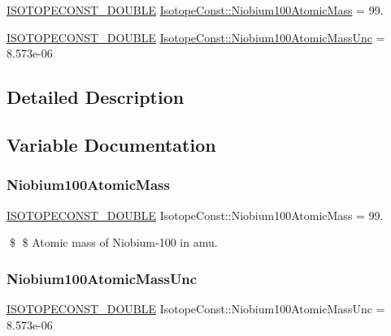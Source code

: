 \begin{DoxyCompactItemize}
\item 
\mbox{\hyperlink{group___isotope_const-_macros_ga8f45a7272ce02c0b4c65c44636ed719a}{I\+S\+O\+T\+O\+P\+E\+C\+O\+N\+S\+T\+\_\+\+D\+O\+U\+B\+LE}} \mbox{\hyperlink{group___isotope_const-_niobium-_nb100_ga2f2b9213a990b40d7ab2ea7dbccfe39d}{Isotope\+Const\+::\+Niobium100\+Atomic\+Mass}} = 99.
\item 
\mbox{\hyperlink{group___isotope_const-_macros_ga8f45a7272ce02c0b4c65c44636ed719a}{I\+S\+O\+T\+O\+P\+E\+C\+O\+N\+S\+T\+\_\+\+D\+O\+U\+B\+LE}} \mbox{\hyperlink{group___isotope_const-_niobium-_nb100_gaae8418b2f4e80cfa44acff1b10259cbe}{Isotope\+Const\+::\+Niobium100\+Atomic\+Mass\+Unc}} = 8.\+573e-\/06
\end{DoxyCompactItemize}


\subsection{Detailed Description}


\subsection{Variable Documentation}
\mbox{\label{group___isotope_const-_niobium-_nb100_ga2f2b9213a990b40d7ab2ea7dbccfe39d}} 
\subsubsection{\texorpdfstring{Niobium100\+Atomic\+Mass}{Niobium100AtomicMass}}
{\footnotesize\ttfamily \mbox{\hyperlink{group___isotope_const-_macros_ga8f45a7272ce02c0b4c65c44636ed719a}{I\+S\+O\+T\+O\+P\+E\+C\+O\+N\+S\+T\+\_\+\+D\+O\+U\+B\+LE}} Isotope\+Const\+::\+Niobium100\+Atomic\+Mass = 99.}

\$ \$ Atomic mass of Niobium-\/100 in amu. \mbox{\label{group___isotope_const-_niobium-_nb100_gaae8418b2f4e80cfa44acff1b10259cbe}} 
\subsubsection{\texorpdfstring{Niobium100\+Atomic\+Mass\+Unc}{Niobium100AtomicMassUnc}}
{\footnotesize\ttfamily \mbox{\hyperlink{group___isotope_const-_macros_ga8f45a7272ce02c0b4c65c44636ed719a}{I\+S\+O\+T\+O\+P\+E\+C\+O\+N\+S\+T\+\_\+\+D\+O\+U\+B\+LE}} Isotope\+Const\+::\+Niobium100\+Atomic\+Mass\+Unc = 8.\+573e-\/06}

